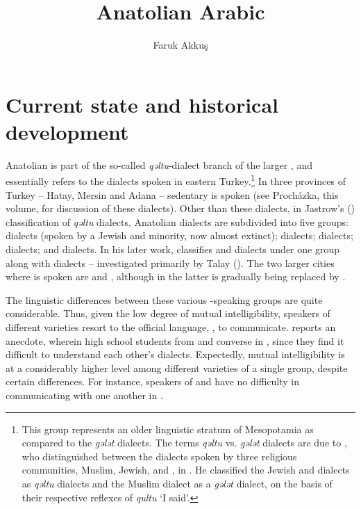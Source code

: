 \documentclass[output=paper]{langsci/langscibook}
\title{Anatolian Arabic}
\author{Faruk Akkuş\affiliation{University of Pennsylvania}}
\begin{document}
\maketitle

\section{Current state and historical development}

Anatolian  is part of the so-called \textit{qəltu}-dialect branch of the larger  , and essentially refers to the  dialects spoken in eastern Turkey.\footnote{This group represents an older linguistic stratum of Mesopotamia as compared to the \textit{gələt} dialects. The terms \textit{qəltu} vs. \textit{gələt} dialects are due to \cite{Blanc1964}, who distinguished between the  dialects spoken by three religious communities,
Muslim, Jewish, and , in . He classified the Jewish and
 dialects as \textit{qəltu} dialects and the Muslim dialect as a \textit{gələt} dialect, on the basis of their respective reflexes of   \textit{qultu} `I said'.} In three provinces of Turkey -- Hatay, Mersin and Adana --  sedentary  is spoken (see Proch\'{a}zka, this volume, for discussion of these dialects). Other than these dialects, in Jastrow's (\citeyear{Jastrow1978}) classification of  \textit{qəltu} dialects, Anatolian  dialects are subdivided into five groups:
 dialects (spoken by a Jewish and  minority, now almost extinct);  dialects;  dialects;  dialects; and  dialects.
In his later work, \citet{Jastrow2011anatolian} classifies  and  dialects under one group along with  dialects -- investigated primarily by Talay (\citeyear{Talay2001,Talay2002}). The two larger cities where  is spoken are  and , although in the latter  is gradually being replaced by .

The linguistic differences between these various -speaking groups are quite considerable. Thus, given the low degree of mutual intelligibility, speakers of different varieties resort to the official language, , to communicate. \citet{Jastrow2006} reports an anecdote, wherein high school students from  and  converse in , since they find it difficult to understand each other's dialects. Expectedly, mutual intelligibility is at a considerably higher level among different varieties of a single group, despite certain differences. For instance,  speakers of  and   have no difficulty in communicating with one another in .
\end{document}
